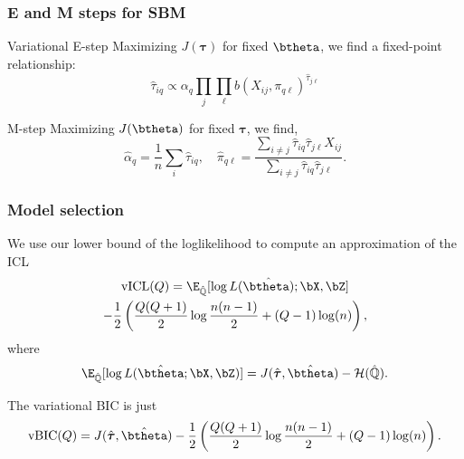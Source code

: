 \documentclass{beamer}\usepackage[]{graphicx}\usepackage[]{color}
\begin{document}
\begin{frame}
  \frametitle{E and M steps for SBM}

  \begin{block}{Variational E-step}
    Maximizing $J(\boldsymbol\tau)$ for fixed $\btheta$, we find a fixed-point relationship:
    \begin{equation}
      \hat{\tau}_{iq} \varpropto \alpha_q \prod_{j} \prod_{\ell} b(X_{ij}, \pi_{q\ell})^{\hat{\tau}_{j\ell}}
    \end{equation}
  \end{block}

  \vfill

  \begin{block}{M-step}
    Maximizing $J(\btheta)$ for fixed $\boldsymbol\tau$, we find,
    \begin{equation}
\hat{\alpha}_q = \frac{1}{n}\sum_i \hat{\tau}_{iq} , \quad \hat\pi_{q\ell} = \frac{\sum_{i\neq j} \hat{\tau}_{iq}\hat{\tau}_{j\ell} X_{ij}}{\sum_{i\neq j} \hat{\tau}_{iq}\hat{\tau}_{j\ell}}.
\end{equation}
  \end{block}

\end{frame}

\begin{frame}
  \frametitle{Model selection}

  We use our lower bound of the  loglikelihood to compute an approximation of the ICL
  \begin{multline*}
  \mathrm{vICL}(Q) = \E_{\hat{\mathbb{Q}}} [\log L(\hat{\btheta)};\bX,\bZ] \\ - \frac{1}{2} \left(\frac{Q(Q+1)}{2} \log \frac{n(n-1)}{2} + (Q-1) \log (n) \right),
\end{multline*}
where
    \begin{equation*}
      \E_{\hat{\mathbb{Q}}} [\log L(\hat\btheta; \bX,\bZ)] = J(\hat{\boldsymbol\tau},\hat\btheta) - \mathcal{H}(\hat{\mathbb{Q}}).
    \end{equation*}

    The variational BIC is just
    \begin{equation*}
  \mathrm{vBIC}(Q) = J(\hat{\boldsymbol\tau},\hat\btheta) - \frac{1}{2} \left(\frac{Q(Q+1)}{2} \log \frac{n(n-1)}{2} + (Q-1) \log (n) \right).
    \end{equation*}

\end{frame}
\end{document}
